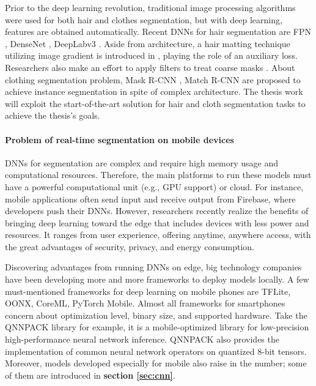 Prior to the deep learning revolution, traditional image processing algorithms were used for both hair and clothes segmentation, but with deep learning, features are obtained automatically. Recent DNNs for hair segmentation are FPN \cite{fpn}, DenseNet \cite{densenet}, DeepLabv3 \cite{deeplabv3}. Aside from architecture, a hair matting technique utilizing image gradient is introduced in \cite{hairseg2matting}, playing the role of an auxiliary loss. Researchers also make an effort to apply filters to treat coarse masks \cite{hairseg2matting}. About clothing segmentation problem, Mask R-CNN \cite{maskrcnn}, Match R-CNN \cite{deepfashion2} are proposed to achieve instance segmentation in spite of complex architecture. The thesis work will exploit the start-of-the-art solution for hair and cloth segmentation tasks to achieve the thesis's goals. 
\par
\paragraph{Problem of real-time segmentation on mobile devices}

DNNs for segmentation are complex and require high memory usage and computational resources. Therefore, the main platforms to run these models must have a powerful computational unit (e.g., GPU support) or cloud. For instance, mobile applications often send input and receive output from Firebase, where developers push their DNNs. However, researchers recently realize the benefits of bringing deep learning toward the edge that includes devices with less power and resources. It ranges from user experience, offering anytime, anywhere access, with the great advantages of security, privacy, and energy consumption. \par

Discovering advantages from running DNNs on edge, big technology companies have been developing more and more frameworks to deploy models locally. A few must-mentioned frameworks for deep learning on mobile phones are TFLite, OONX, CoreML, PyTorch Mobile. Almost all frameworks for smartphones concern about optimization level, binary size, and supported hardware. Take the QNNPACK library \cite{qnnpack} for example, it is a mobile-optimized library for low-precision high-performance neural network inference. QNNPACK also provides the implementation of common neural network operators on quantized 8-bit tensors. Moreover, models developed especially for mobile also raise in the number; some of them are introduced in \textbf{section \ref{sec:cnn}}. 



